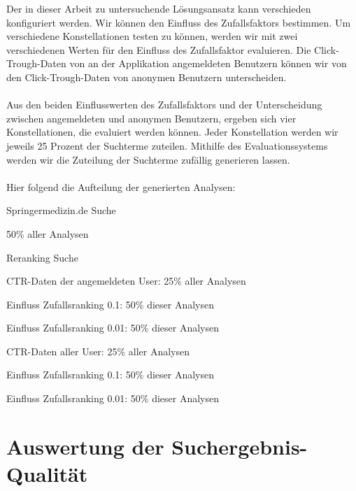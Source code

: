 Der in dieser Arbeit zu untersuchende Lösungsansatz kann verschieden konfiguriert werden. Wir können den Einfluss des Zufallsfaktors bestimmen. Um verschiedene Konstellationen testen zu können, werden wir mit zwei verschiedenen Werten für den Einfluss des Zufallsfaktor evaluieren. Die Click-Trough-Daten von an der Applikation angemeldeten Benutzern können wir von den Click-Trough-Daten von anonymen Benutzern unterscheiden.
\\
\\
Aus den beiden Einflusswerten des Zufallsfaktors und der Unterscheidung zwischen angemeldeten und anonymen Benutzern, ergeben sich vier Konstellationen, die evaluiert werden können. Jeder Konstellation werden wir jeweils 25 Prozent der Suchterme zuteilen. Mithilfe des Evaluationssystems werden wir die Zuteilung der Suchterme zufällig generieren lassen.
\\
\\
Hier folgend die Aufteilung der generierten Analysen:

\centering
\begin{myitemize}
\setlength\itemsep{0em}
\item Springermedizin.de Suche 
\begin{myitemize}
\item 50\% aller Analysen
\end{myitemize}
\item Reranking Suche 
\begin{myitemize}
\item CTR-Daten der angemeldeten User: 25\% aller Analysen
\begin{myitemize}
\item Einfluss Zufallsranking 0.1: 50\% dieser Analysen 
\item Einfluss Zufallsranking 0.01: 50\% dieser Analysen 
\end{myitemize}
\item CTR-Daten aller User: 25\% aller Analysen
\begin{myitemize}
\item Einfluss Zufallsranking 0.1: 50\% dieser Analysen 
\item Einfluss Zufallsranking 0.01: 50\% dieser Analysen 
\end{myitemize}
\end{myitemize}
\end{myitemize}

\section{Auswertung der Suchergebnis-Qualität}
\label{sec:Evaluation:Auswertung}


